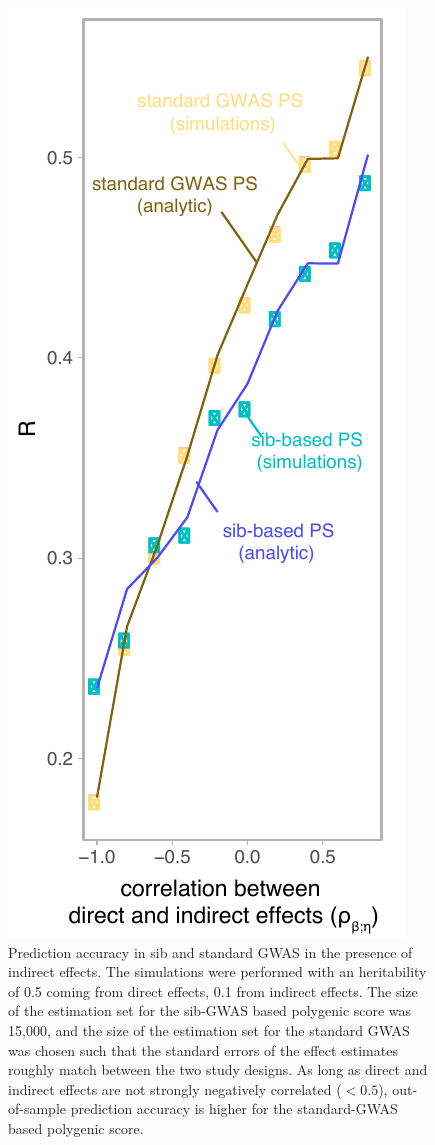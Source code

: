\documentclass[hidelinks, 12pt]{article}
\begin{document}
\begin{figure}[!h]
\centering
\includegraphics{supp_figures/R_vs_rho_indirect_simulation_and_analytic.pdf}
\caption[Prediction accuracy in sib and standard GWAS in the presence of indirect effects.]{\small Prediction accuracy in sib and standard GWAS in the presence of indirect effects.  The simulations were performed with an heritability of 0.5 coming from direct effects, 0.1 from indirect effects.  The size of the estimation set for the sib-GWAS based polygenic score was 15,000, and the size of the estimation set for the standard GWAS was chosen such that the standard errors of the effect estimates roughly match between the two study designs. As long as direct and indirect effects are not strongly negatively correlated ($<0.5$), out-of-sample prediction accuracy is higher for the standard-GWAS based polygenic score.}
\label{fig_R_vs_rho_sims}
\end{figure}
\end{document}
